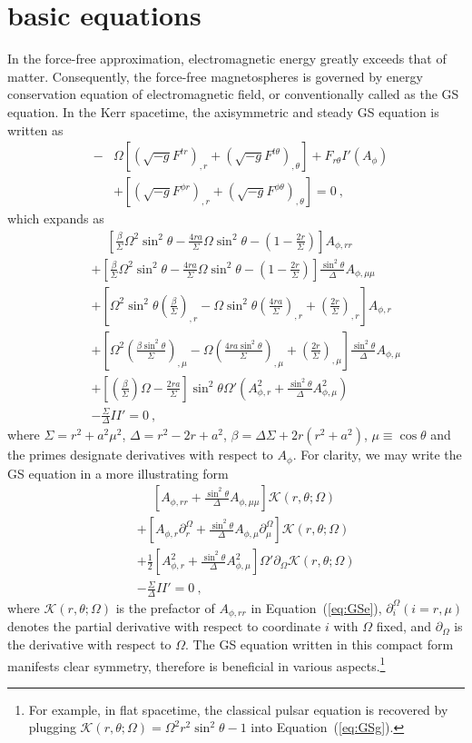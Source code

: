 \documentclass[iop,apj]{emulateapj}
\def\nn{\nonumber}
\def\ct{\cos\theta}
\def\sst{\sin^2\theta}
\def\Ar{A_{\phi,r}}
\def\Arr{A_{\phi,rr}}
\def\Am{A_{\phi,\mu}}
\def\Amm{A_{\phi,\mu\mu}}
\def\ben{\begin{eqnarray}}
\def\een{\end{eqnarray}}
\begin{document}
\section{basic equations}
\label{sec:basic}
In the force-free approximation, electromagnetic energy greatly exceeds that of matter.
Consequently, the force-free magnetospheres is governed by energy
conservation equation of electromagnetic field, or
conventionally called as the GS equation. In the Kerr spacetime,
the axisymmetric and steady
GS equation is written as \citep{Pan2014}
\ben
\label{eq:GS}
&-&\Omega \left[(\sqrt{-g}F^{tr})_{,r} +
(\sqrt{-g}F^{t\theta})_{,\theta} \right] + F_{r\theta}I'(A_\phi) \nn\\
&&+ \left[(\sqrt{-g}F^{\phi r})_{,r} +
(\sqrt{-g}F^{\phi\theta})_{,\theta} \right] = 0 \ ,
\een
which expands as
\citep[see also e.g.][in slightly different forms]{Contopoulos2013, Nathanail2014, Pan2016}
\ben
\label{eq:GSe}
&&\phantom{+}
 \left[\frac{\beta}{\Sigma}\Omega^2 \sst
-\frac{4ra}{\Sigma}\Omega \sst
-\left(1-\frac{2r}{\Sigma}\right)\right] \Arr  \nn\\
&&
+\left[\frac{\beta}{\Sigma}\Omega^2 \sst
-\frac{4ra}{\Sigma}\Omega \sst
-\left(1-\frac{2r}{\Sigma}\right)\right] \frac{\sst}{\Delta } \Amm \nn \\
&&
+ \left[  \Omega^2 \sst\left(\frac{\beta}{\Sigma}\right)_{,r}
-\Omega\sst\left(\frac{4ra}{\Sigma}\right)_{,r}
+\left(\frac{2r}{\Sigma}\right)_{,r}\right] \Ar \nn\\
&&
+\left[ \Omega^2\left( \frac{\beta\sst}{\Sigma} \right)_{,\mu}
-\Omega\left(\frac{4ra\sst}{\Sigma}\right)_{,\mu}
+\left(\frac{2r}{\Sigma}\right)_{,\mu}\right]\frac{\sst}{\Delta}\Am \nn \\
&&
+ \left[ \left(\frac{\beta}{\Sigma}\right) \Omega-\frac{2ra}{\Sigma}\right]
\sst\Omega'\left(\Ar^2 + \frac{\sst}{\Delta}\Am^2\right) \nn\\
&&
- \frac{\Sigma}{\Delta} II' = 0 \ ,
\een
where $\Sigma = r^2 + a^2 \mu^2$, $\Delta = r^2 -2r + a^2$, $\beta = \Delta\Sigma + 2r(r^2 + a^2)$,
$\mu\equiv\ct$ and  the primes designate  derivatives with respect to $A_\phi$.
For clarity, we may write the GS equation in a more illustrating form
\ben
\label{eq:GSg}
&&\phantom{+}
 \left[\Arr + \frac{\sst}{\Delta}\Amm \right]  \mathcal K(r,\theta; \Omega )\nn \\
&&
+\left[\Ar \partial_r^\Omega  +  \frac{\sst}{\Delta}\Am \partial_\mu^\Omega\right] \mathcal K(r,\theta; \Omega ) \nn \\
&&
+ \frac{1}{2}\left[\Ar^2 + \frac{\sst}{\Delta}\Am^2\right]  \Omega' \partial_\Omega \mathcal K(r,\theta; \Omega )\nn \\
&&
- \frac{\Sigma}{\Delta}II' = 0 \ ,
\een
where $\mathcal K(r,\theta; \Omega )$ is the prefactor of $\Arr$ in Equation~(\ref{eq:GSe}),
$\partial_i^\Omega (i=r, \mu)$  denotes the partial derivative
with respect to coordinate $i$ with $\Omega$ fixed, and $\partial_\Omega$ is the derivative with
respect to $\Omega$. The GS equation written in this compact form manifests clear symmetry,
therefore is beneficial in various aspects.\footnote{
For example, in flat spacetime, the classical pulsar
equation \citep{Scharlemann1973} is recovered by plugging
$\mathcal K(r,\theta; \Omega ) = \Omega^2 r^2\sst - 1$ into Equation~(\ref{eq:GSg}).}
\end{document}
